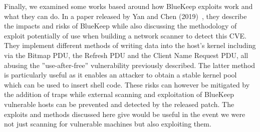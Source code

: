 Finally, we examined some works based around how BlueKeep exploits work and what they can do. In a paper released by Yan and Chen (2019)~\cite{yan_chen_2019}, they describe the impacts and risks of BlueKeep while also discussing the methodology of exploit potentially of use when building a network scanner to detect this CVE. They implement different methods of writing data into the host's kernel including via the Bitmap PDU, the Refresh PDU and the Client Name Request PDU, all abusing the ''use-after-free'' vulnerability previously described. The latter method is particularly useful as it enables an attacker to obtain a stable kernel pool which can be used to insert shell code. These risks can however be mitigated by the addition of traps while external scanning and exploitation of BlueKeep vulnerable hosts can be prevented and detected by the released patch. The exploits and methods discussed here give would be useful in the event we were not just scanning for vulnerable machines but also exploiting them.